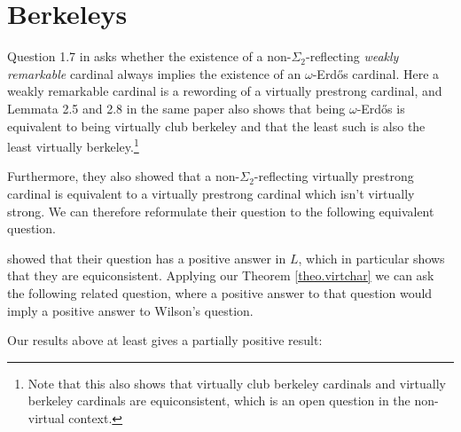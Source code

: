 \documentclass[../../main]{subfiles}
\begin{document}


\section{Berkeleys}

Question 1.7 in \cite{RemarkableWilson} asks whether the existence of a non-$\Sigma_2$-reflecting \textit{weakly remarkable} cardinal always implies the existence of an $\omega$-Erd\H os cardinal. Here a weakly remarkable cardinal is a rewording of a virtually prestrong cardinal, and Lemmata 2.5 and 2.8 in the same paper also shows that being $\omega$-Erd\H os is equivalent to being virtually club berkeley and that the least such is also the least virtually berkeley.\footnote{Note that this also shows that virtually club berkeley cardinals and virtually berkeley cardinals are equiconsistent, which is an open question in the non-virtual context.}

\qquad Furthermore, they also showed that a non-$\Sigma_2$-reflecting virtually prestrong cardinal is equivalent to a virtually prestrong cardinal which isn't virtually strong. We can therefore reformulate their question to the following equivalent question.


\cite{RemarkableWilson} showed that their question has a positive answer in $L$, which in particular shows that they are equiconsistent. Applying our Theorem \ref{theo.virtchar} we can ask the following related question, where a positive answer to that question would imply a positive answer to Wilson's question.


Our results above at least gives a partially positive result:

\end{document}
